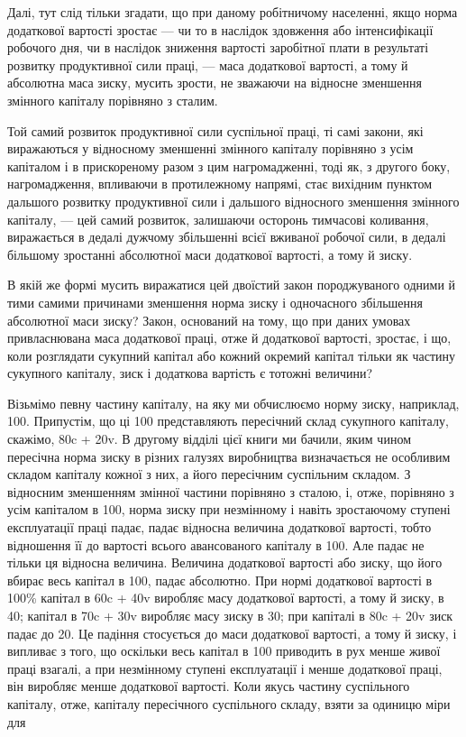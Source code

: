Далі, тут слід тільки згадати, що при даному робітничому населенні,
якщо норма додаткової вартості зростає — чи то в наслідок
здовження або інтенсифікації робочого дня, чи в наслідок зниження
вартості заробітної плати в результаті розвитку продуктивної
сили праці, — маса додаткової вартості, а тому й абсолютна
маса зиску, мусить зрости, не зважаючи на відносне
зменшення змінного капіталу порівняно з сталим.

Той самий розвиток продуктивної сили суспільної праці, ті самі
закони, які виражаються у відносному зменшенні змінного капіталу
порівняно з усім капіталом і в прискореному разом з цим нагромадженні,
тоді як, з другого боку, нагромадження, впливаючи
в протилежному напрямі, стає вихідним пунктом дальшого розвитку
продуктивної сили і дальшого відносного зменшення змінного
капіталу, — цей самий розвиток, залишаючи осторонь тимчасові
коливання, виражається в дедалі дужчому збільшенні
всієї вживаної робочої сили, в дедалі більшому зростанні абсолютної
маси додаткової вартості, а тому й зиску.

В якій же формі мусить виражатися цей двоїстий закон породжуваного
одними й тими самими причинами зменшення норма
зиску і одночасного збільшення абсолютної маси зиску? Закон,
оснований на тому, що при даних умовах привласнювана маса
додаткової праці, отже й додаткової вартості, зростає, і що, коли
розглядати сукупний капітал або кожний окремий капітал тільки
як частину сукупного капіталу, зиск і додаткова вартість є тотожні
величини?

Візьмімо певну частину капіталу, на яку ми обчислюємо
норму зиску, наприклад, 100. Припустім, що ці 100 представляють
пересічний склад сукупного капіталу, скажімо, 80c + 20v.
В другому відділі цієї книги ми бачили, яким чином пересічна
норма зиску в різних галузях виробництва визначається не особливим
складом капіталу кожної з них, а його пересічним суспільним
складом. З відносним зменшенням змінної частини порівняно
з сталою, і, отже, порівняно з усім капіталом в 100, норма зиску
при незмінному і навіть зростаючому ступені експлуатації праці
падає, падає відносна величина додаткової вартості, тобто відношення
її до вартості всього авансованого капіталу в 100.
Але падає не тільки ця відносна величина. Величина додаткової
вартості або зиску, що його вбирає весь капітал в 100, падає
абсолютно. При нормі додаткової вартості в 100\% капітал в
60c + 40v виробляє масу додаткової вартості, а тому й зиску,
в 40; капітал в 70c + 30v виробляє масу зиску в  30; при капіталі
в 80c + 20v зиск падає до 20. Це падіння стосується до
маси додаткової вартості, а тому й зиску, і випливає з того,
що оскільки весь капітал в 100 приводить в рух менше живої
праці взагалі, а при незмінному ступені експлуатації
і менше додаткової праці, він виробляє менше додаткової вартості.
Коли якусь частину суспільного капіталу, отже, капіталу
пересічного суспільного складу, взяти за одиницю міри для
